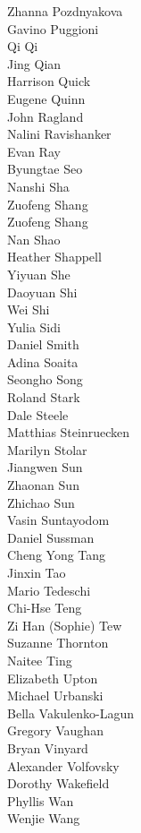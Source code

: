 Zhanna Pozdnyakova\\
Gavino Puggioni\\
Qi Qi\\
Jing Qian\\
Harrison  Quick\\
Eugene Quinn\\
John Ragland\\
Nalini Ravishanker\\
Evan Ray\\
Byungtae Seo\\
Nanshi Sha\\
Zuofeng Shang\\
Zuofeng Shang\\
Nan Shao\\
Heather Shappell\\
Yiyuan She\\
Daoyuan Shi\\
Wei Shi\\
Yulia Sidi\\
Daniel Smith\\
Adina Soaita\\
Seongho Song\\
Roland Stark\\
Dale Steele\\
Matthias Steinruecken\\
Marilyn Stolar\\
Jiangwen Sun\\
Zhaonan Sun\\
Zhichao Sun\\
Vasin  Suntayodom\\
Daniel Sussman\\
Cheng Yong Tang\\
Jinxin Tao\\
Mario  Tedeschi\\
Chi-Hse Teng\\
Zi Han (Sophie) Tew\\
Suzanne Thornton\\
Naitee Ting\\
Elizabeth Upton\\
Michael Urbanski\\
Bella Vakulenko-Lagun\\
Gregory Vaughan\\
Bryan Vinyard\\
Alexander Volfovsky\\
Dorothy Wakefield\\
Phyllis Wan\\
Wenjie Wang\\
